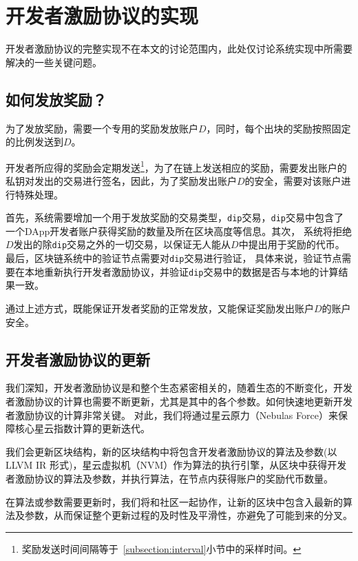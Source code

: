 \section{开发者激励协议的实现}
开发者激励协议的完整实现不在本文的讨论范围内，此处仅讨论系统实现中所需要解决的一些关键问题。

\subsection{如何发放奖励？}
为了发放奖励，需要一个专用的奖励发放账户$D$，同时，每个出块的奖励按照固定的比例发送到$D$。

开发者所应得的奖励会定期发送\footnote{奖励发送时间间隔等于~\ref{subsection:interval}小节中的采样时间。}，为了在链上发送相应的奖励，需要发出账户的私钥对发出的交易进行签名，因此，为了奖励发出账户$D$的安全，需要对该账户进行特殊处理。

首先，系统需要增加一个用于发放奖励的交易类型，\texttt{dip}交易，\texttt{dip}交易中包含了一个DApp开发者账户获得奖励的数量及所在区块高度等信息。其次，
系统将拒绝$D$发出的除\texttt{dip}交易之外的一切交易，以保证无人能从$D$中提出用于奖励的代币。最后，区块链系统中的验证节点需要对\texttt{dip}交易进行验证，
具体来说，验证节点需要在本地重新执行开发者激励协议，并验证\texttt{dip}交易中的数据是否与本地的计算结果一致。

通过上述方式，既能保证开发者奖励的正常发放，又能保证奖励发出账户$D$的账户安全。

\subsection{开发者激励协议的更新}
我们深知，开发者激励协议是和整个生态紧密相关的，随着生态的不断变化，开发者激励协议的计算也需要不断更新，尤其是其中的各个参数。如何快速地更新开发者激励协议的计算非常关键。
对此，我们将通过星云原力（Nebulas Force）来保障核心星云指数计算的更新迭代。

我们会更新区块结构，新的区块结构中将包含开发者激励协议的算法及参数(以 LLVM IR 形式)，星云虚拟机（NVM）作为算法的执行引擎，从区块中获得开发者激励协议的算法及参数，并执行算法，在节点内获得账户的奖励代币数量。

在算法或参数需要更新时，我们将和社区一起协作，让新的区块中包含入最新的算法及参数，从而保证整个更新过程的及时性及平滑性，亦避免了可能到来的分叉。
